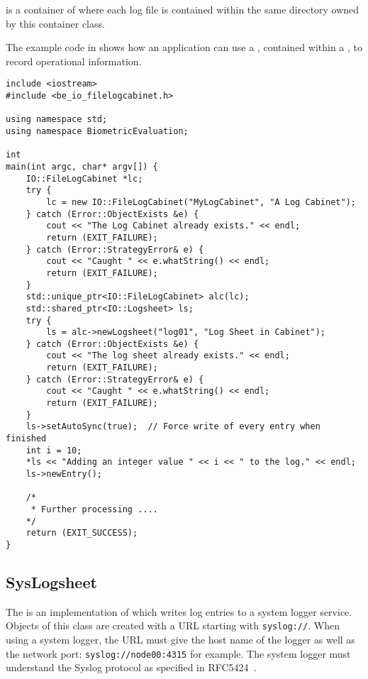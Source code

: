  is a container of  where
each log file is contained within the same directory owned by this container
class.

The example code in  shows how an application can use 
a , contained within a , to record
operational information.

\begin{lstlisting}[caption={Using a \class{FileLogsheet} within a \class{FileLogCabinet}}, label=lst:logcabinetuse]
include <iostream>
#include <be_io_filelogcabinet.h>

using namespace std;
using namespace BiometricEvaluation;

int
main(int argc, char* argv[]) {
    IO::FileLogCabinet *lc;
    try {
        lc = new IO::FileLogCabinet("MyLogCabinet", "A Log Cabinet");
    } catch (Error::ObjectExists &e) {
        cout << "The Log Cabinet already exists." << endl;
        return (EXIT_FAILURE);
    } catch (Error::StrategyError& e) {
        cout << "Caught " << e.whatString() << endl;
        return (EXIT_FAILURE);
    }
    std::unique_ptr<IO::FileLogCabinet> alc(lc);
    std::shared_ptr<IO::Logsheet> ls;
    try {
        ls = alc->newLogsheet("log01", "Log Sheet in Cabinet");
    } catch (Error::ObjectExists &e) {
        cout << "The log sheet already exists." << endl;
        return (EXIT_FAILURE);
    } catch (Error::StrategyError& e) {
        cout << "Caught " << e.whatString() << endl;
        return (EXIT_FAILURE);
    }
    ls->setAutoSync(true);  // Force write of every entry when finished
    int i = 10;
    *ls << "Adding an integer value " << i << " to the log." << endl;
    ls->newEntry();

    /*
     * Further processing ....
    */
    return (EXIT_SUCCESS);
}
\end{lstlisting}

\subsection{SysLogsheet}
\label{sec-syslogsheet}

The  is an implementation of  which writes
log entries to a system logger service. Objects of this class are created
with a URL starting with \verb=syslog://=.
When using a system logger, the URL must give the host name of the logger as
well as the network port: \verb=syslog://node00:4315= for example. The system
logger must understand the Syslog protocol as specified in
RFC5424~\cite{rfc5425}.

